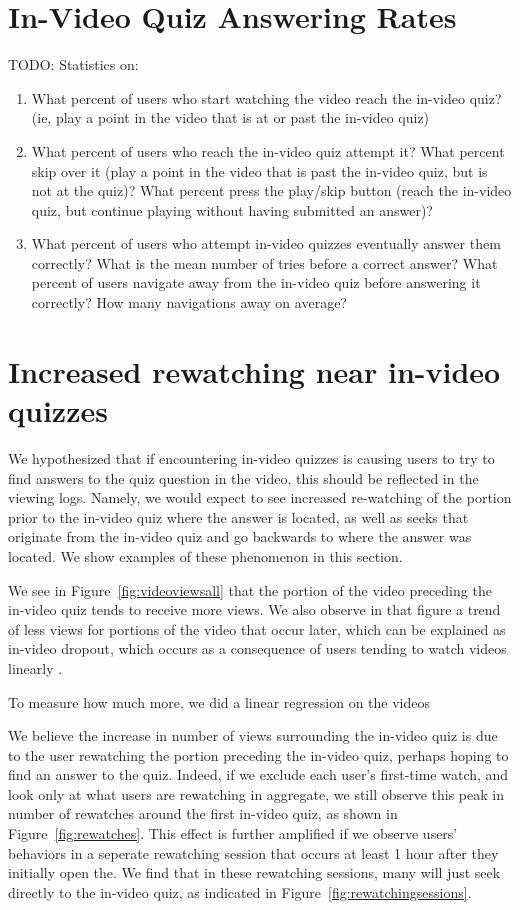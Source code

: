 \documentclass{sigchi}
\begin{document}
\section{In-Video Quiz Answering Rates}

TODO: Statistics on:

\begin{enumerate}
\item What percent of users who start watching the video reach the in-video quiz? (ie, play a point in the video that is at or past the in-video quiz)
\item What percent of users who reach the in-video quiz attempt it? What percent skip over it (play a point in the video that is past the in-video quiz, but is not at the quiz)? What percent press the play/skip button (reach the in-video quiz, but continue playing without having submitted an answer)?
\item What percent of users who attempt in-video quizzes eventually answer them correctly? What is the mean number of tries before a correct answer? What percent of users navigate away from the in-video quiz before answering it correctly? How many navigations away on average?
\end{enumerate}

\section{Increased rewatching near in-video quizzes}

We hypothesized that if encountering in-video quizzes is causing users to try to find answers to the quiz question in the video, this should be reflected in the viewing logs. Namely, we would expect to see increased re-watching of the portion prior to the in-video quiz where the answer is located, as well as seeks that originate from the in-video quiz and go backwards to where the answer was located. We show examples of these phenomenon in this section.

We see in Figure~\ref{fig:videoviewsall} that the portion of the video preceding the in-video quiz tends to receive more views. We also observe in that figure a trend of less views for portions of the video that occur later, which can be explained as in-video dropout, which occurs as a consequence of users tending to watch videos linearly \cite{juho}.

To measure how much more, we did a linear regression on the videos

We believe the increase in number of views surrounding the in-video quiz is due to the user rewatching the portion preceding the in-video quiz, perhaps hoping to find an answer to the quiz. Indeed, if we exclude each user's first-time watch, and look only at what users are rewatching in aggregate, we still observe this peak in number of rewatches around the first in-video quiz, as shown in Figure~\ref{fig:rewatches}. This effect is further amplified if we observe users' behaviors in a seperate rewatching session that occurs at least 1 hour after they initially open the. We find that in these rewatching sessions, many will just seek directly to the in-video quiz, as indicated in Figure~\ref{fig:rewatchingsessions}.
\end{document}
